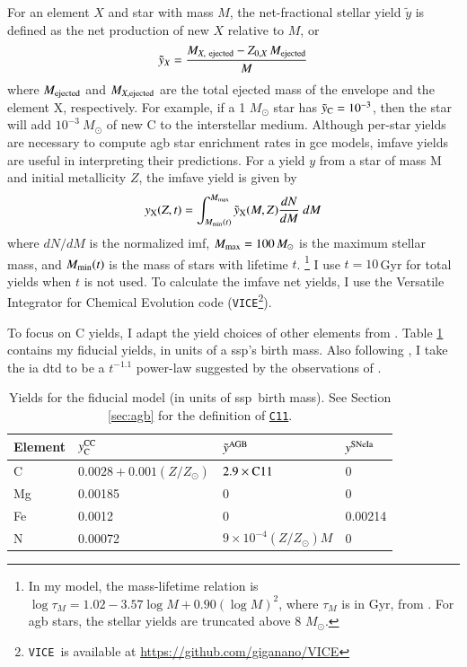 \documentclass[12pt,oneside,letterpaper]{report}
\newcommand{\agb}{\gls{agb}}
\newcommand{\ia}{\gls{ia}}
\newcommand{\ssp}{\gls{ssp}}
\newcommand{\imf}{\gls{imf}}
\newcommand{\gce}{\gls{gce}}
\newcommand{\cxi}{\texttt{\hyperlink{C11}{C11}}}
\newcommand{\VICE}{\texttt{VICE}}
\newcommand{\Ycc}{\ensuremath{y_{\rm C}^{\rm CC}}}
\begin{document}
For an element $X$ and star with mass $M$, the net-fractional stellar \gls{yield} $\tilde{y}$ is defined as the net production of new $X$ relative to $M$, or
\begin{equation}
    \tilde{y}_{X} = \frac{M_{X,\ \rm ejected} - Z_{0, X}\,M_{\rm ejected}}{M}   
\end{equation}
where $M_{\rm ejected}$ and $M_{X, \rm ejected}$  are the total ejected mass of the envelope and the element X, respectively. For example, if a 1 $M_\odot$ star has $\tilde{y}_{\rm C} = 10^{-3}$, then the star will add $10^{-3}\ M_\odot$ of new C to the interstellar medium. 
Although per-star yields are necessary to compute \agb{} star enrichment rates in \gce{}  models, \gls{imfave} yields are useful in interpreting their predictions. For a yield $y$ from a star of mass M and initial metallicity $Z$, the \gls{imfave} yield is given by 
\begin{equation} \label{eq:imf-yield}
    y_{\rm X}(Z,t) = 
    \int_{M_{\rm min}(t)}^{M_{\rm max}} 
    \tilde{y}_{\rm X}(M, Z)
    \frac{dN}{dM}  \ dM
\end{equation}
where ${dN}/{dM}$ is the normalized \imf, $M_{\rm max}=100\,M_\odot$ is the maximum stellar mass, and $M_{\rm min}(t)$ is the mass of stars with lifetime $t$. 
\footnote{In my model, the mass-lifetime relation is
$\log \tau_M = 1.02 - 3.57\log M + 0.90 \left(\log M\right)^2$,
where $\tau_M$ is in Gyr,
from \citealt{larson74}.  For \agb{} stars, the stellar yields are truncated above 8 $M_{\odot}$. }
I use $t=10\,$Gyr for total yields when $t$ is not used.
To calculate the \gls{imfave} net yields, I use the Versatile Integrator for Chemical Evolution code (\VICE\footnote{\VICE~is available at \url{https://github.com/giganano/VICE}}).

To focus on C yields, I adapt the yield choices of other elements from \citet{james+21, james+23}.
Table \ref{tab:fiducial_mod} contains my fiducial \glspl{yield}, in units of a \ssp's birth mass.
Also following \citet{james+21, james+23}, I take the \ia{} \gls{dtd} to be a
$t^{-1.1}$ power-law suggested by the observations of \citet{maoz+12}.


\begin{table}
	\centering
    \caption[Fiducial Model Yields]{Yields for the fiducial model (in units of \ssp~birth mass). See Section \ref{sec:agb} for the definition of \cxi.}
	\label{tab:fiducial_mod}

	\begin{tabular}{l l l l}
		\toprule
        Element & $\Ycc$ & $\tilde{y}^{\rm AGB}$ & $y^{\rm SNe Ia}$ \\
		\midrule
        C & $0.0028 + 0.001(Z/Z_\odot)$ & $2.9\times{\rm C11}$ &  0 \\
        Mg & 0.00185 & 0 & 0 \\
        Fe & 0.0012 & 0 & 0.00214 \\
        N & 0.00072 & $9\times10^{-4}(Z/Z_\odot)M$ & 0\\
		\bottomrule
	\end{tabular}
\end{table}
\end{document}
